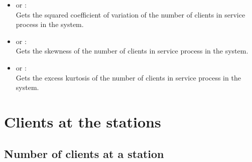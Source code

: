 \begin{itemize}
\item
{} or :\\
Gets the squared coefficient of variation of the number of clients in service process in the system.

\item
{} or :\\
Gets the skewness of the number of clients in service process in the system.

\item
{} or :\\
Gets the excess kurtosis of the number of clients in service process in the system.

\end{itemize}





\section{Clients at the stations}



\subsection{Number of clients at a station}

